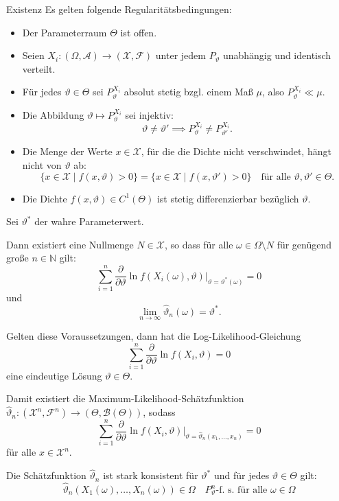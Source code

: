 \begin{defi}{Existenz}
    Es gelten folgende Regularitätsbedingungen:
    \begin{itemize}
        \item Der Parameterraum $\Theta$ ist offen.
        \item Seien $X_i: (\Omega, \mathcal{A}) \to (\mathcal{X}, \mathcal{F})$ unter jedem $P_{\vartheta}$ unabhängig und identisch verteilt.
        \item Für jedes $\vartheta \in \Theta$ sei $P_{\vartheta}^{X_i}$ absolut stetig bzgl. einem Maß $\mu$, also $P_{\vartheta}^{X_i} \ll \mu$.
        \item Die Abbildung $\vartheta \mapsto P_{\vartheta}^{X_i}$ sei injektiv:
              \[
                  \vartheta \neq \vartheta' \implies P_{\vartheta}^{X_i} \neq P_{\vartheta'}^{X_i}.
              \]
        \item Die Menge der Werte $x \in \mathcal{X}$, für die die Dichte nicht verschwindet, hängt nicht von $\vartheta$ ab:
              \[
                  \{ x \in \mathcal{X} \mid f(x, \vartheta) > 0 \} = \{ x \in \mathcal{X} \mid f(x, \vartheta') > 0 \} \quad \text{für alle } \vartheta, \vartheta' \in \Theta.
              \]
        \item Die Dichte $f(x, \vartheta) \in C^1(\Theta)$ ist stetig differenzierbar bezüglich $\vartheta$.
    \end{itemize}

    Sei $\vartheta^*$ der wahre Parameterwert.

    Dann existiert eine Nullmenge $N \in \mathcal{X}$, so dass für alle $\omega \in \Omega \setminus N$ für genügend große $n \in \mathbb{N}$ gilt:
    \[
        \sum_{i=1}^n \frac{\partial}{\partial \vartheta} \ln f(X_i(\omega), \vartheta) \Big|_{\vartheta = \vartheta^*(\omega)} = 0
    \]
    und
    \[
        \lim_{n \to \infty} \hat{\vartheta}_n(\omega) = \vartheta^*.
    \]

    Gelten diese Voraussetzungen, dann hat die Log-Likelihood-Gleichung
    \[
        \sum_{i=1}^n \frac{\partial}{\partial \vartheta} \ln f(X_i, \vartheta) = 0
    \]
    eine eindeutige Lösung $\vartheta \in \Theta$.

    Damit existiert die Maximum-Likelihood-Schätzfunktion $\hat{\vartheta}_n: (\mathcal{X}^n, \mathcal{F}^n) \to (\Theta, \mathcal{B}(\Theta))$, sodass
    \[
        \sum_{i=1}^n \frac{\partial}{\partial \vartheta} \ln f(X_i, \vartheta) \Big|_{\vartheta = \hat{\vartheta}_n(x_1, \dotsc, x_n)} = 0
    \]
    für alle $x \in \mathcal{X}^n$.

    Die Schätzfunktion $\hat{\vartheta}_n$ ist stark konsistent für $\vartheta^*$ und für jedes $\vartheta \in \Theta$ gilt:
    \[
        \hat{\vartheta}_n (X_1(\omega), \dotsc, X_n(\omega)) \in \Omega \quad P_{\vartheta}^n\text{-f. s.} \text{ für alle } \omega \in \Omega
    \]
\end{defi}

